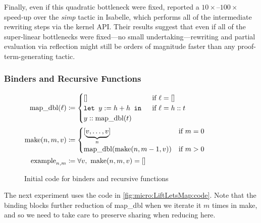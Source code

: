 Finally, even if this quadratic bottleneck were fixed, \textcite{Aehlig} reported a $10\times$--$100\times$ speed-up over the \emph{simp} tactic in Isabelle, which performs all of the intermediate rewriting steps via the kernel API.
Their results suggest that even if all of the super-linear bottlenecks were fixed---no small undertaking---rewriting and partial evaluation via reflection might still be orders of magnitude faster than any proof-term-generating tactic.

\subsubsection{Binders and Recursive Functions}\label{sec:micro:LiftLetsMap}

\begin{figure}
{\small %
$\begin{aligned}
  \text{map\_dbl}(\ell) & \defeq \begin{cases} [] & \text{if }\ell = [] \\
      \letin[{y := h + h}{}] & \text{if }\ell = h::t \\
      y :: \text{map\_dbl}(t) &
      \end{cases} \\
  \text{make}(n, m, v) & \defeq \begin{cases} [\underbrace{v, \ldots, v}_n] & \text{if }m = 0 \\
      \text{map\_dbl}(\text{make}(n, m-1, v)) & \text{if }m > 0
      \end{cases} \\
  \text{example}_{n, m} & \defeq \forall v,\ \text{make}(n, m, v) = []
\end{aligned}$}%
\caption{\label{fig:micro:LiftLetsMap:code}Initial code for binders and recursive functions}
\end{figure}

The next experiment uses the code in \autoref{fig:micro:LiftLetsMap:code}.
Note that the  binding blocks further reduction of map\_dbl when we iterate it $m$ times in make, and so we need to take care to preserve sharing when reducing here.

